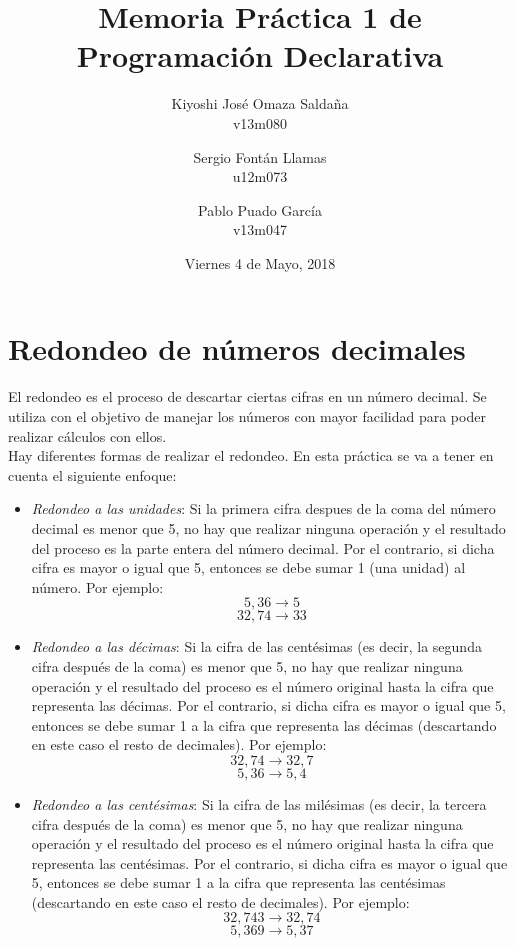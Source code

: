 \documentclass[11pt, a4paper]{article}
\title{\Huge Memoria Práctica 1 de Programación Declarativa}
\date{Viernes 4 de Mayo, 2018}
\author{Kiyoshi José Omaza Saldaña\\ v13m080
\and Sergio Fontán Llamas\\ u12m073
\and Pablo Puado García\\ v13m047}
\begin{document}
\begin{titlepage}
\maketitle
\end{titlepage}

\tableofcontents
\newpage
{}
\section{Redondeo de números decimales}
El redondeo es el proceso de descartar ciertas cifras en un número decimal. Se utiliza
con el objetivo de manejar los números con mayor facilidad para poder realizar
cálculos con ellos.\\
Hay diferentes formas de realizar el redondeo. En esta práctica se va a tener en
cuenta el siguiente enfoque:\\
\begin{itemize}
 \item \textit{Redondeo a las unidades}: Si la primera cifra despues de la coma del número decimal es menor que 5, no hay que realizar ninguna operación y el resultado del proceso es la parte entera del número decimal. Por el contrario, si dicha cifra es mayor o igual que 5, entonces se debe sumar 1 (una unidad) al número. Por ejemplo:
 $$5,36 \rightarrow 5$$
 $$32,74 \rightarrow 33$$
 \item \textit{Redondeo a las décimas}: Si la cifra de las centésimas (es decir, la segunda cifra después de la coma) es menor que 5, no hay que realizar ninguna operación y el resultado del proceso es el número original hasta la cifra que representa las décimas. Por el contrario, si dicha cifra es mayor o igual que 5, entonces se debe sumar 1 a la cifra que representa las décimas (descartando en este caso el resto de decimales). Por ejemplo:
 $$32,74 \rightarrow 32,7$$
 $$5,36 \rightarrow 5,4$$
 \item \textit{Redondeo a las centésimas}: Si la cifra de las milésimas (es decir, la tercera cifra después de la coma) es menor que 5, no hay que realizar ninguna operación y el resultado del proceso es el número original hasta la cifra que representa las centésimas. Por el contrario, si dicha cifra es mayor o igual que 5, entonces se debe sumar 1 a la cifra que representa las centésimas (descartando en este caso el resto de decimales). Por ejemplo:
 $$32,743 \rightarrow 32,74$$
 $$5,369 \rightarrow 5,37$$
\end{itemize}
\end{document}

